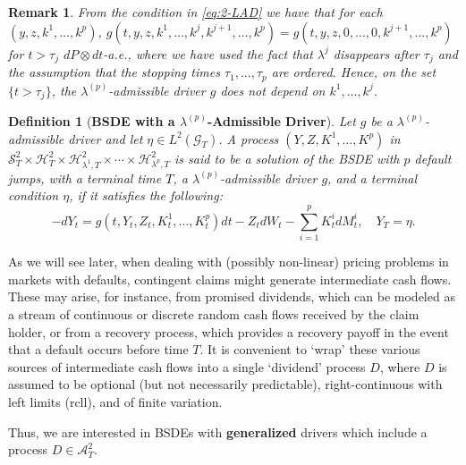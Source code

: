\documentclass[11pt,a4paper]{article}
\numberwithin{equation}{section}
\theoremstyle{newPlain}
\theoremstyle{newDefinition}
\newtheorem{definition}[theorem]{Definition}
\theoremstyle{newRemark}
\newtheorem{remark}[theorem]{Remark}
\begin{document}
{\begin{remark}
    From the condition  in \eqref{eq:2-LAD} we have that for each $(y, z, k^1,\ldots,k^p)$,  $g(t,y,z,k^1,\ldots,k^j,k^{j+1},\ldots,k^p)=g(t,y,z,0,\ldots,0,k^{j+1},\ldots,k^p)$ for $t>\tau_j$ $dP\otimes dt$-a.e., where we have used the fact that $\lambda^j$ disappears after $\tau_j$ and the assumption that the stopping times $\tau_1,\ldots,\tau_p$ are ordered. Hence, on the set $\{t>\tau_j\}$, the $\lambda^{(p)}$-admissible driver $g$ does not depend on $k^1,\ldots,k^j$.
\end{remark}

\begin{definition}[\textbf{BSDE with a $\lambda^{(p)}$-Admissible Driver}]
    Let $g$ be a $\lambda^{(p)}$-admissible driver and let $\eta\in L^2(\mathcal{G}_T)$. A process  $(Y, Z, K^1,\ldots,K^p)$ in $\mathcal{S}_T^2\times\mathcal{H}_T^2\times\mathcal{H}_{\lambda^1,T}^2\times\cdots\times\mathcal{H}_{\lambda^p,T}^2$ is said to be a solution of the BSDE with $p$ default jumps, with a terminal time $T$, a $\lambda^{(p)}$-admissible driver $g$, and a terminal condition $\eta$, if it satisfies the following:
    \begin{equation}
        -dY_t = g(t, Y_t, Z_t, K_t^1,\ldots,K_t^p)dt - Z_tdW_t - \sum_{i=1}^pK_t^idM_t^i,\quad Y_T=\eta.
    \end{equation}
\end{definition}

As we will see later, when dealing with (possibly non-linear) pricing problems in markets with defaults, contingent claims might  generate intermediate cash flows. These may arise, for instance,  from promised dividends, which can be modeled as a stream of continuous or discrete random cash flows received by the claim holder, or from a recovery process, which provides a recovery payoff in the event that a default occurs before time $T$. %
It is convenient to `wrap' these various sources of intermediate cash flows into a single `dividend' process $D$, where $D$ is assumed to be optional (but not necessarily predictable), right-continuous with left limits (rcll), and of finite variation.

Thus, we are interested in BSDEs with \textbf{generalized} drivers which include a process $D \in \mathcal{A}_T^2$.


}
\end{document}
